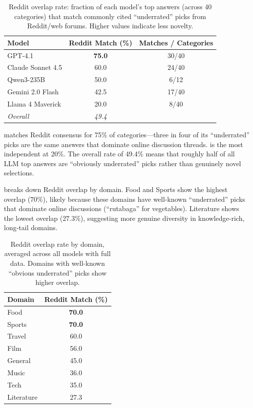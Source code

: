 \begin{table}[t]
    \centering
    \caption{Reddit overlap rate: fraction of each model's top answers (across 40 categories) that match commonly cited ``underrated'' picks from Reddit/web forums. Higher values indicate less novelty.}
    \begin{tabular}{@{}lcc@{}}
        \toprule
        \textbf{Model} & \textbf{Reddit Match (\%)} & \textbf{Matches / Categories} \\
        \midrule
        GPT-4.1 & \textbf{75.0} & 30/40 \\
        Claude Sonnet 4.5 & 60.0 & 24/40 \\
        Qwen3-235B & 50.0 & 6/12 \\
        Gemini 2.0 Flash & 42.5 & 17/40 \\
        Llama 4 Maverick & 20.0 & 8/40 \\
        \midrule
        \textit{Overall} & \textit{49.4} & \\
        \bottomrule
    \end{tabular}
    \label{tab:reddit}
\end{table}

\gptfour matches Reddit consensus for 75\% of categories---three in four of its ``underrated'' picks are the same answers that dominate online discussion threads. \llama is the most independent at 20\%. The overall rate of 49.4\% means that roughly half of all LLM top answers are ``obviously underrated'' picks rather than genuinely novel selections.

  breaks down Reddit overlap by domain. Food and Sports show the highest overlap (70\%), likely because these domains have well-known ``underrated'' picks that dominate online discussions (\eg ``rutabaga'' for vegetables). Literature shows the lowest overlap (27.3\%), suggesting more genuine diversity in knowledge-rich, long-tail domains.

\begin{table}[t]
    \centering
    \caption{Reddit overlap rate by domain, averaged across all models with full data. Domains with well-known ``obvious underrated'' picks show higher overlap.}
    \begin{tabular}{@{}lc@{}}
        \toprule
        \textbf{Domain} & \textbf{Reddit Match (\%)} \\
        \midrule
        Food & \textbf{70.0} \\
        Sports & \textbf{70.0} \\
        Travel & 60.0 \\
        Film & 56.0 \\
        General & 45.0 \\
        Music & 36.0 \\
        Tech & 35.0 \\
        Literature & 27.3 \\
        \bottomrule
    \end{tabular}
    \label{tab:domain}
\end{table}


